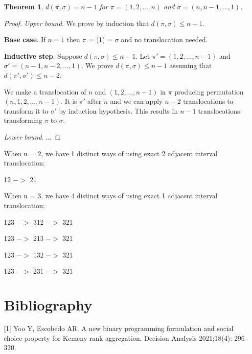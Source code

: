 \documentclass{article}
\newtheorem{theorem}{Theorem}
\begin{document}
\begin{theorem}
$d(\pi,\sigma)=n-1$ for $\pi=(1,2,\dots,n)$ and $\sigma=(n,n-1,\dots,1)$.
\end{theorem}

\begin{proof}
{\em Upper bound}. 
We prove by induction that $d(\pi,\sigma)\le n-1$. 

\textbf{Base case}. If $n=1$ then $\pi$ = (1) = $\sigma$ and no translocation needed.

\textbf{Inductive step}.
Suppose $d(\pi,\sigma)\le n-1$.
Let $\pi'=(1,2,\dots,n-1)$ and $\sigma'=(n-1,n-2,\dots,1)$.
We prove $d(\pi,\sigma)\le n-1$ assuming that $d(\pi',\sigma')\le n-2$.

We make a translocation of $n$ and $(1,2,...,n-1)$ in $\pi$ producing permutation $(n, 1, 2, \dots, n-1)$.
It is $\pi'$ after $n$ and we can apply $n-2$ translocations to transform it to $\sigma'$ by induction hypothesis. 
This results in $n-1$ translocations transforming $\pi$ to $\sigma$.

{\em Lower bound}. ...
\end{proof}

When n = 2, we have 1 distinct ways of using exact 2 adjacent interval translocation:

12 $->$ 21

When n = 3, we have 4 distinct ways of using exact 1 adjacent interval translocation:

123 $->$ 312 $->$ 321

123 $->$ 213 $->$ 321

123 $->$ 132 $->$ 321

123 $->$ 231 $->$ 321


\section*{Bibliography}
[1] Yoo Y, Escobedo AR. A new binary programming formulation and social
choice property for Kemeny rank aggregation. Decision Analysis 2021;18(4):
296–320.
\end{document}
